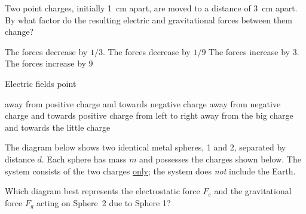 \documentclass[answers]{exam}
\begin{document}
\begin{questions}
\question
Two point charges, initially \SI{1}{cm} apart, are moved to a distance of \SI{3}{cm} apart. By what factor do the resulting electric and gravitational forces between them change?

\begin{randomizechoices}
    \choice The forces decrease by $1/3$.
    \correctchoice The forces decrease by $1/9$
    \choice The forces increase by $3$.
    \choice The forces increase by $9$
\end{randomizechoices}

\question
Electric fields point

\begin{randomizechoices}
    \correctchoice away from positive charge and towards negative charge
    \choice away from negative charge and towards positive charge
    \choice from left to right
    \choice away from the big charge and towards the little charge  
\end{randomizechoices}

\question
The diagram below shows two identical metal spheres, 1 and 2, separated by distance $d$. Each sphere has mass $m$ and possesses the charges shown below. The system consists of the two charges \underline{only}; the system does \textit{not} include the Earth.

\begin{center}
\end{center}

Which diagram best represents the electrostatic force $F_e$ and the gravitational force $F_g$ acting on Sphere~2 due to Sphere 1?


\end{questions}
\end{document}
